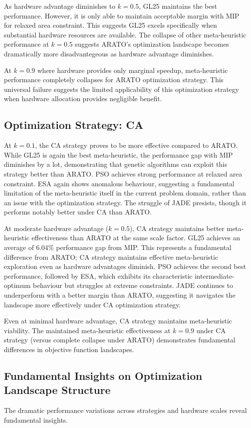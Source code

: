 As hardware advantage diminishes to $k=0.5$, GL25 maintains the best performance. However, it is only able to maintain acceptable margin with MIP for relaxed area constraint. This suggests GL25 excels specifically when substantial hardware resources are available. The collapse of other meta-heuristic performance at $k=0.5$ suggests ARATO's optimization landscape becomes dramatically more disadvantegeous as hardware advantage diminishes.

At $k=0.9$ where hardware provides only marginal speedup, meta-heuristic performance completely collapses for ARATO optimization strategy. 
This universal failure suggests the limited applicability of this optimization strategy when hardware allocation provides negligible benefit.

\subsection{Optimization Strategy: CA}

At $k=0.1$, the CA strategy proves to be more effective compared to ARATO. While GL25 is again the best meta-heuristic, the performance gap with MIP diminishes by a lot, demonstrating that genetic algorithms can exploit this strategy better than ARATO. PSO achieves strong performance at relaxed area constraint. ESA again shows anomalous behaviour, suggesting a fundamental limitation of the meta-heuristic itself in the current problem domain, rather than an issue with the optimization strategy. The struggle of JADE presists, though it performs notably better under CA than ARATO.

At moderate hardware advantage ($k=0.5$), CA strategy maintains better meta-heuristic effectiveness than ARATO at the same scale factor. GL25 achieves an average of 6.04\% performance gap from MIP. This represents a fundamental difference from ARATO; CA strategy maintains effective meta-heuristic exploration even as hardware advantages diminish. PSO achieves the second best performance, followed by ESA, which exhibits its characteristic intermediate-optimum behaviour but struggles at extreme constraints. JADE continues to underperform with a better margin than ARATO, suggesting it navigates the landscape more effectively under CA optimization strategy. 

Even at minimal hardware advantage, CA strategy maintains meta-heuristic viability. The maintained meta-heuristic effectiveness at $k=0.9$ under CA strategy (versus complete collapse under ARATO) demonstrates fundamental differences in objective function landscapes.


\subsection{Fundamental Insights on Optimization Landscape Structure}

The dramatic performance variations across strategies and hardware scales reveal fundamental insights.

